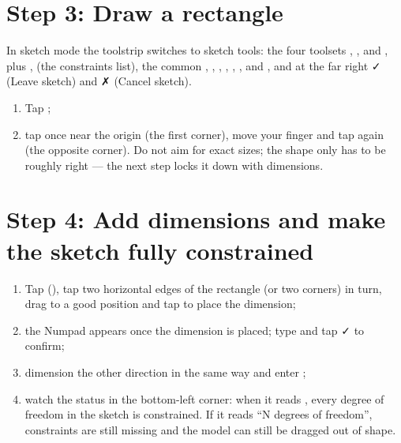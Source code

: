 
\section{Step 3: Draw a rectangle}

In sketch mode the toolstrip switches to sketch tools: the four toolsets , ,
 and , plus ,  (the constraints list), the common
, , , , , ,  and
, and at the far right ✓ (Leave sketch) and ✗ (Cancel sketch).

\begin{enumerate}
  \item Tap ;
  \item tap once near the origin (the first corner), move your finger and tap again (the opposite corner). Do
        not aim for exact sizes; the shape only has to be roughly right — the next step locks it down with
        dimensions.
\end{enumerate}


\section{Step 4: Add dimensions and make the sketch fully constrained}

\begin{enumerate}
  \item Tap  (), tap two horizontal edges of the rectangle (or two
        corners) in turn, drag to a good position and tap to place the dimension;
  \item the Numpad appears once the dimension is placed; type  and tap ✓ to confirm;
  \item dimension the other direction in the same way and enter ;
  \item watch the status in the bottom-left corner: when it reads , every degree of
        freedom in the sketch is constrained. If it reads “N degrees of freedom”, constraints are still
        missing and the model can still be dragged out of shape.
\end{enumerate}

